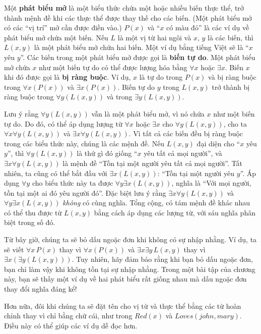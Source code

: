 Một \textbf{phát biểu mở} là một biểu thức chứa một hoặc nhiều biến thực thể, trở thành mệnh đề khi các thực thể được thay thế cho các biến. (Một phát biểu mở có các ``vị trí'' mở cần được điền vào.) $P(x)$ và ``$x$ có màu đỏ'' là các ví dụ về phát biểu mở chứa một biến. Nếu $L$ là một vị từ hai ngôi và $x$, $y$ là các biến, thì $L(x,y)$ là một phát biểu mở chứa hai biến. Một ví dụ bằng tiếng Việt sẽ là ``$x$ yêu $y$''. Các biến trong một phát biểu mở được gọi là \textbf{biến tự do}. Một phát biểu mở chứa $x$ như một biến tự do có thể được lượng hóa bằng $\forall x$ hoặc $\exists x$. Biến $x$ khi đó được gọi là \textbf{bị ràng buộc}. Ví dụ, $x$ là tự do trong $P(x)$ và bị ràng buộc trong $\forall x(P(x))$ và $\exists x(P(x))$. Biến tự do $y$ trong $L(x,y)$ trở thành bị ràng buộc trong $\forall y(L(x,y))$ và trong $\exists y(L(x,y))$.

Lưu ý rằng $\forall y(L(x,y))$ vẫn là một phát biểu mở, vì nó chứa $x$ như một biến tự do. Do đó, có thể áp dụng lượng từ $\forall x$ hoặc $\exists x$ cho $\forall y(L(x,y))$, cho ta $\forall x \forall y(L(x,y))$ và $\exists x \forall y(L(x,y))$. Vì tất cả các biến đều bị ràng buộc trong các biểu thức này, chúng là các mệnh đề. Nếu $L(x,y)$ đại diện cho ``$x$ yêu $y$'', thì $\forall y(L(x,y))$ là thứ gì đó giống ``$x$ yêu tất cả mọi người'', và $\exists x \forall y(L(x,y))$ là mệnh đề ``Tồn tại một người yêu tất cả mọi người''. Tất nhiên, ta cũng có thể bắt đầu với $\exists x(L(x,y))$: ``Tồn tại một người yêu $y$''. Áp dụng $\forall y$ cho biểu thức này ta được $\forall y \exists x(L(x,y))$, nghĩa là ``Với mọi người, tồn tại một ai đó yêu người đó''. Đặc biệt lưu ý rằng $\exists x \forall y(L(x,y))$ và $\forall y \exists x(L(x,y))$ \textit{không} có cùng nghĩa. Tổng cộng, có tám mệnh đề khác nhau có thể thu được từ $L(x,y)$ bằng cách áp dụng các lượng từ, với sáu nghĩa phân biệt trong số đó.

\begin{infobox}
Từ bây giờ, chúng ta sẽ bỏ dấu ngoặc đơn khi không có sự nhập nhằng. Ví dụ, ta sẽ viết $\forall x\, P(x)$ thay vì $\forall x(P(x))$ và $\exists x \exists y\, L(x,y)$ thay vì $\exists x(\exists y(L(x,y)))$. Tuy nhiên, hãy đảm bảo rằng khi bạn bỏ dấu ngoặc đơn, bạn chỉ làm vậy khi không tồn tại sự nhập nhằng. Trong một bài tập của chương này, bạn sẽ thấy một ví dụ về hai phát biểu rất giống nhau mà dấu ngoặc đơn thay đổi nghĩa đáng kể!

Hơn nữa, đôi khi chúng ta sẽ đặt tên cho vị từ và thực thể bằng các từ hoàn chỉnh thay vì chỉ bằng chữ cái, như trong $Red(x)$ và $Loves(john, mary)$. Điều này có thể giúp các ví dụ dễ đọc hơn.
\end{infobox}

